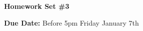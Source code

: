 
\usepackage{braket}

\def\ketY{\ensuremath{\ket {\Psi}}}
\def\iGeV{\ensuremath{\textrm{GeV}^{-1}}}
\def\mp{\ensuremath{m_{\textrm{proton}}}}
\def\rp{\ensuremath{r_{\textrm{proton}}}}
\def\me{\ensuremath{m_{\textrm{electron}}}}
\def\aG{\ensuremath{\alpha_G}}
\def\rAtom{\ensuremath{r_{\textrm{atom}}}}
\def\rNucl{\ensuremath{r_{\textrm{nucleus}}}}
\def\GN{\ensuremath{\textrm{G}_\textrm{N}}}

\def\be{\begin{equation*}}
\def\ee{\end{equation*}}


\usepackage{fancyhdr}

\fancyhf{}

\thispagestyle{fancy}






\begin{center}
{\huge \textbf{Homework Set \#3}}
\large

{\textbf{ Due Date:} Before 5pm Friday January 7th  }
\end{center}

